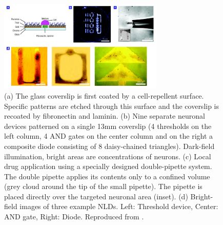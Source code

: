 \begin{figure}
\begin{center}
\includegraphics[width=0.7\textwidth]{../fig/expdesignpaper.png}
\end{center}
\caption{(a) The glass coverslip is first coated by a cell-repellent surface. Specific patterns are etched through this surface and the coverslip is recoated by fibronectin and laminin. (b) Nine separate neuronal devices patterned on a single 13mm coverslip (4 thresholds on the left column, 4 AND gates on the center column and on the right a composite diode consisting of 8 daisy-chained triangles). Dark-field illumination, bright areas are concentrations of neurons. (c) Local drug application using a specially designed double-pipette system. The double pipette applies its contents only to a confined volume (grey cloud around the tip of the small pipette). The pipette is placed directly over the targeted neuronal area (inset). (d) Bright-field images of three example NLDs. Left: Threshold device, Center: AND gate, Right: Diode. Reproduced from \cite{Feinerman2008}.}\label{fig:patNLD}
\end{figure}

